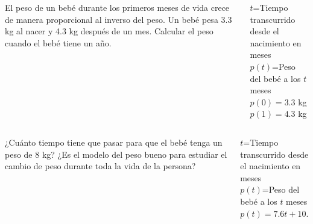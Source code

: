 \documentclass[aspectratio=149,10pt,t]{beamer}
\begin{document}
\begin{frame}
\begin{columns}
\begin{column}[T]{0.6\textwidth}
El peso de un bebé durante los primeros meses de vida crece de manera proporcional al inverso del peso.
Un bebé pesa 3.3 kg al nacer y 4.3 kg después de un mes.
Calcular el peso cuando el bebé tiene un año. 
\end{column}
\begin{column}[T]{0.4\textwidth}
\begin{datos}
$t$=Tiempo transcurrido desde el nacimiento en meses\\
$p(t)$=Peso del bebé a los $t$ meses\\
$p(0)=3.3$ kg\\
$p(1)=4.3$ kg
\end{datos}
\end{column}
\end{columns}
\end{frame}


\begin{frame}
\begin{columns}
\begin{column}[T]{0.6\textwidth}
¿Cuánto tiempo tiene que pasar para que el bebé tenga un peso de 8 kg?
¿Es el modelo del peso bueno para estudiar el cambio de peso durante toda la vida de la persona?
\end{column}
\begin{column}[T]{0.4\textwidth}
\begin{datos}
$t$=Tiempo transcurrido desde el nacimiento en meses\\
$p(t)$=Peso del bebé a los $t$ meses\\
$p(t)=7.6t+10.89$
\end{datos}
\end{column}
\end{columns}
\end{frame}
\end{document}
